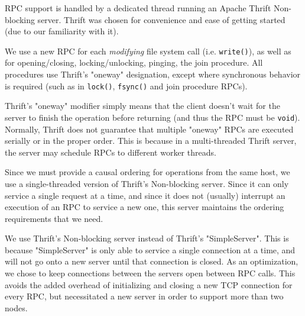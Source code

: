 RPC support is handled by a dedicated thread running an Apache Thrift Non-blocking
server. Thrift was chosen for convenience and ease of getting started (due to
our familiarity with it).

We use a new RPC for each \textit{modifying} file system call (i.e.
\texttt{write()}), as well as for opening/closing, locking/unlocking, pinging,
the join procedure. All procedures use Thrift's "oneway" designation, except
where synchronous behavior is required (such as in \texttt{lock()},
\texttt{fsync()} and join procedure RPCs).

Thrift's "oneway" modifier simply means that the client doesn't wait for the
server to finish the operation before returning (and thus the RPC must be
\texttt{void}). Normally, Thrift does not guarantee that multiple "oneway" RPCs
are executed serially or in the proper order. This is because in a
multi-threaded Thrift server, the server may schedule RPCs to different worker
threads.

Since we must provide a causal ordering for operations from the same host, we
use a single-threaded version of Thrift's Non-blocking server. Since it can only
service a single request at a time, and since it does not (usually) interrupt an
execution of an RPC to service a new one, this server maintains the ordering
requirements that we need.

We use Thrift's Non-blocking server instead of Thrift's "SimpleServer". This is
because "SimpleServer" is only able to service a single connection at a time,
and will not go onto a new server until that connection is closed. As an
optimization, we chose to keep connections between the servers open between RPC
calls. This avoids the added overhead of initializing and closing a new TCP
connection for every RPC, but necessitated a new server in order to support
more than two nodes.

